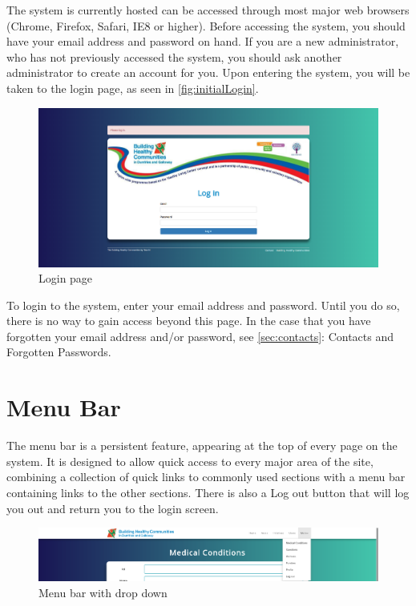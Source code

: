 \documentclass{bhcguides}
\begin{document}
The system is currently hosted can be accessed through most major web browsers (Chrome, Firefox, Safari, IE8 or higher). Before accessing the system, you should have your email address and password on hand. If you are a new administrator, who has not previously accessed the system, you should ask another administrator to create an account for you. Upon entering the system, you will be taken to the login page, as seen in \autoref{fig:initialLogin}.

\begin{figure}[h!]
 \centerline{\includegraphics[width=\textwidth, height=\textheight, keepaspectratio]{loginscreen.png}}
 \caption{Login page}
 \label{fig:initialLogin}
\end{figure}

To login to the system, enter your email address and password. Until you do so, there is no way to gain access beyond this page. In the case that you have forgotten your email address and/or password, see \autoref{sec:contacts}: Contacts and Forgotten Passwords.

\section{Menu Bar}
\label{sec:menubar}

The menu bar is a persistent feature, appearing at the top of every page on the system. It is designed to allow quick access to every major area of the site, combining a collection of quick links to commonly used sections with a menu bar containing links to the other sections. There is also a Log out button that will log you out and return you to the login screen.

\begin{figure}[h!]
 \centerline{\includegraphics[width=\textwidth, height=\textheight, keepaspectratio]{menubar.png}}
 \caption{Menu bar with drop down}
 \label{fig:initialLogin}
\end{figure}
\pagebreak
\end{document}
